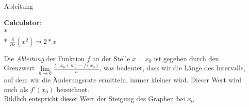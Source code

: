 \begin{bla}{Ableitung}
  \begin{marginfigure}
    \begin{tcolorbox}[colback=white!95!black,colframe=white!75!black,title=CAS:,arc=0mm]
      \begin{scriptsize}
        \textbf{Calculator}: \\*
         \\*
        \hfill \( \tfrac{\partial}{\partial x}(x^2) \leadsto 2*x \)
      \end{scriptsize}
    \end{tcolorbox}
  \end{marginfigure}
  Die \emph{Ableitung} der Funktion $f$ an der Stelle $x=x_0$ ist gegeben durch den Grenzwert $\lim\limits_{h \to 0}\frac{f(x_0+h)-f(x_0)}{h}$, was bedeutet, dass wir die Länge des Intervalls, auf dem wir die Änderungsrate ermitteln, immer kleiner wird. Dieser Wert wird auch als $f'(x_0)$ bezeichnet. \\ Bildlich entspricht dieser Wert der Steigung des Graphen bei $x_0$.
\end{bla}

\clearpage


